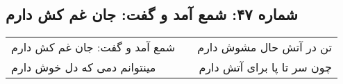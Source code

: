 \begin{center}
\section*{شماره ۴۷: شمع آمد و گفت: جان غم کش دارم}
\label{sec:047}
\begin{longtable}{l p{0.5cm} r}
شمع آمد و گفت: جان غم کش دارم
&&
تن در آتش حال مشوش دارم
\\
مینتوانم دمی که دل خوش دارم
&&
چون سر تا پا برای آتش دارم
\\
\end{longtable}
\end{center}
